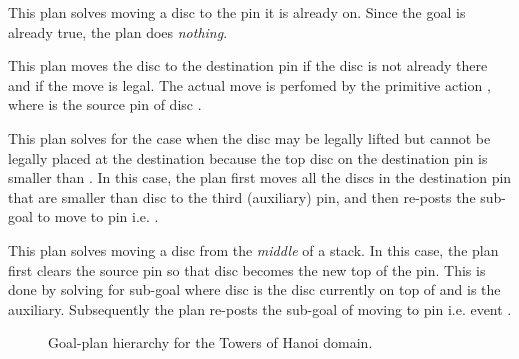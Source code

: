 {} This plan solves moving a disc to the pin it is
already on. Since the goal is already true, the plan does \emph{nothing}.

{} This plan moves the disc  to the destination
pin  if the disc is not already there and if the move is legal. The actual move
is perfomed by the primitive action , where  is the source pin
of disc .

{} This plan solves for the case when the disc  
may be legally lifted but cannot be legally placed at the destination because the 
top disc on the destination pin is smaller than .
In this case, the plan first moves all the discs in the destination pin that are
smaller than disc  to the third (auxiliary) pin, and then
re-posts the sub-goal to move  to pin  i.e. . 

{} This plan solves moving a disc from the
\emph{middle} of a stack.
In this case, the plan first clears the source pin so
that disc  becomes the new top of the pin. This is done by
solving for sub-goal  where disc  is the
disc currently on top of  and  is the
auxiliary.
Subsequently the plan re-posts the
sub-goal of moving  to pin  i.e. event .


\begin{figure}[t]
\begin{center}
\resizebox{.9\textwidth}{!}{}
\end{center}
\caption{Goal-plan hierarchy for the Towers of Hanoi domain.}
\label{fig:hanoi_goalplan}
\end{figure}


